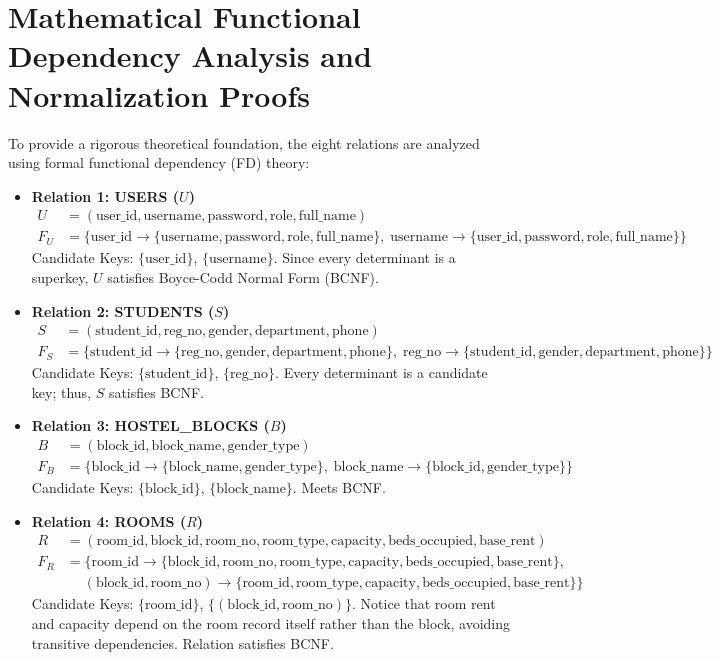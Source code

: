 \documentclass[12pt,a4paper]{report}
\begin{document}
\section{Mathematical Functional Dependency Analysis and Normalization Proofs}
To provide a rigorous theoretical foundation, the eight relations are analyzed using formal functional dependency (FD) theory:
\begin{itemize}
\item \textbf{Relation 1: USERS ($U$)}
\begin{align*}
U &= (\text{user\_id}, \text{username}, \text{password}, \text{role}, \text{full\_name}) \\
F_U &= \{ \text{user\_id} \to \{\text{username}, \text{password}, \text{role}, \text{full\_name}\}, \; \text{username} \to \{\text{user\_id}, \text{password}, \text{role}, \text{full\_name}\} \}
\end{align*}
Candidate Keys: $\{\text{user\_id}\}$, $\{\text{username}\}$. Since every determinant is a superkey, $U$ satisfies Boyce-Codd Normal Form (BCNF).

\item \textbf{Relation 2: STUDENTS ($S$)}
\begin{align*}
S &= (\text{student\_id}, \text{reg\_no}, \text{gender}, \text{department}, \text{phone}) \\
F_S &= \{ \text{student\_id} \to \{\text{reg\_no}, \text{gender}, \text{department}, \text{phone}\}, \; \text{reg\_no} \to \{\text{student\_id}, \text{gender}, \text{department}, \text{phone}\} \}
\end{align*}
Candidate Keys: $\{\text{student\_id}\}$, $\{\text{reg\_no}\}$. Every determinant is a candidate key; thus, $S$ satisfies BCNF.

\item \textbf{Relation 3: HOSTEL\_BLOCKS ($B$)}
\begin{align*}
B &= (\text{block\_id}, \text{block\_name}, \text{gender\_type}) \\
F_B &= \{ \text{block\_id} \to \{\text{block\_name}, \text{gender\_type}\}, \; \text{block\_name} \to \{\text{block\_id}, \text{gender\_type}\} \}
\end{align*}
Candidate Keys: $\{\text{block\_id}\}$, $\{\text{block\_name}\}$. Meets BCNF.

\item \textbf{Relation 4: ROOMS ($R$)}
\begin{align*}
R &= (\text{room\_id}, \text{block\_id}, \text{room\_no}, \text{room\_type}, \text{capacity}, \text{beds\_occupied}, \text{base\_rent}) \\
F_R &= \{ \text{room\_id} \to \{\text{block\_id}, \text{room\_no}, \text{room\_type}, \text{capacity}, \text{beds\_occupied}, \text{base\_rent}\}, \\
&\quad\; (\text{block\_id}, \text{room\_no}) \to \{\text{room\_id}, \text{room\_type}, \text{capacity}, \text{beds\_occupied}, \text{base\_rent}\} \}
\end{align*}
Candidate Keys: $\{\text{room\_id}\}$, $\{(\text{block\_id}, \text{room\_no})\}$. Notice that room rent and capacity depend on the room record itself rather than the block, avoiding transitive dependencies. Relation satisfies BCNF.


\end{itemize}
\end{document}
